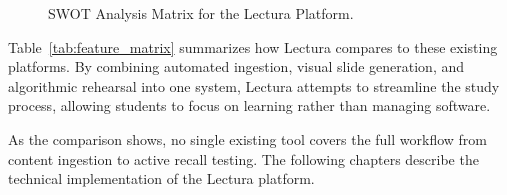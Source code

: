 \begin{figure}[htbp]
\caption{SWOT Analysis Matrix for the Lectura Platform.}
\label{fig:swot_matrix}
\end{figure}

Table~\ref{tab:feature_matrix} summarizes how Lectura compares to these existing platforms. By combining automated ingestion, visual slide generation, and algorithmic rehearsal into one system, Lectura attempts to streamline the study process, allowing students to focus on learning rather than managing software.

\begin{table}[htbp]
\centering
{}
\vspace{6pt}
\caption{Feature comparison of Lectura against existing educational and productivity platforms.}
\label{tab:feature_matrix}
\end{table}

As the comparison shows, no single existing tool covers the full workflow from content ingestion to active recall testing. The following chapters describe the technical implementation of the Lectura platform.
